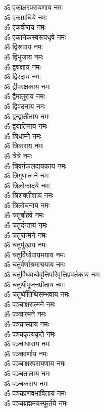 \begin{multicols}{2}
\begin{flushleft}
ॐ एकाक्षरपरायणाय नमः\\
ॐ एकाग्रधिये नमः\\
ॐ एकवीराय नमः\\
ॐ एकानेकस्वरूपधृषे नमः\\
ॐ द्विरूपाय नमः\hfill{}\\
ॐ द्विभुजाय नमः\\
ॐ द्व्यक्षाय नमः\\
ॐ द्विरदाय नमः\\
ॐ द्वीपरक्षकाय नमः\\
ॐ द्वैमातुराय नमः\\
ॐ द्विवदनाय नमः\\
ॐ द्वन्द्वातीताय नमः\\
ॐ द्वयातिगाय नमः\\
ॐ त्रिधाम्ने नमः\\
ॐ त्रिकराय नमः\hfill{}\\
ॐ त्रेत्रे नमः\\
ॐ त्रिवर्गफलदायकाय नमः\\
ॐ त्रिगुणात्मने नमः\\
ॐ त्रिलोकादये नमः\\
ॐ त्रिशक्तीशाय नमः\\
ॐ त्रिलोचनाय नमः\\
ॐ चतुर्बाहवे नमः\\
ॐ चतुर्दन्ताय नमः\\
ॐ चतुरात्मने नमः\\
ॐ चतुर्मुखाय नमः\hfill{}\\
ॐ चतुर्विधोपायमयाय नमः\\
ॐ चतुर्वर्णाश्रमाश्रयाय नमः\\
ॐ चतुर्विधवचोवृत्तिपरिवृत्तिप्रवर्तकाय नमः\\
ॐ चतुर्थीपूजनप्रीताय नमः\\
ॐ चतुर्थीतिथिसम्भवाय नमः\\
ॐ पञ्चाक्षरात्मने नमः\\
ॐ पञ्चात्मने नमः\\
ॐ पञ्चास्याय नमः\\
ॐ पञ्चकृत्यकृते नमः\\
ॐ पञ्चाधाराय नमः\hfill{}\\
ॐ पञ्चवर्णाय नमः\\
ॐ पञ्चाक्षरपरायणाय नमः\\
ॐ पञ्चतालाय नमः\\
ॐ पञ्चकराय नमः\\
ॐ पञ्चप्रणवभाविताय नमः\\
ॐ पञ्चब्रह्ममयस्फूर्तये नमः\\

\end{flushleft}
\end{multicols}
